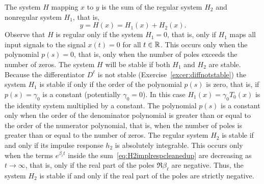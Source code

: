 
The system $H$ mapping $x$ to $y$ is the sum of the regular system $H_2$ and nonregular system $H_1$, that is,
\[
y = H(x) = H_1(x) + H_2(x).
\] 
Observe that $H$ is regular only if the system $H_1 = 0$, that is, only if $H_1$ maps all input signals to the signal $x(t) = 0$ for all $t \in {\mathbb R}$.  This occurs only when the polynomial $p(s) = 0$, that is, only when the number of poles exceeds the number of zeros.  The system $H$ will be stable if both $H_1$ and $H_2$ are stable.  Because the differentiator $D^\ell$ is not stable (Exercise~\ref{excer:diffnotstable}) the system $H_1$ is stable if only if the order of the polynomial $p(s)$ is zero, that is, if $p(s) = \gamma_0$ is a constant (potentially $\gamma_0 = 0$).  In this case $H_1(x) = \gamma_0 T_0(x)$ is the identity system multiplied by a constant.  The polynomial $p(s)$ is a constant only when the order of the denominator polynomial is greater than or equal to the order of the numerator polynomial, that is, when the number of poles is greater than or equal to the number of zeros.  The regular system $H_2$ is stable if and only if its impulse response $h_2$ is absolutely integrable.  This occurs only when the terms $e^{\beta_\ell t}$ inside the sum~\eqref{eq:H2implrespcleanedup} are decreasing as $t \rightarrow \infty$, that is, only if the real part of the poles $\Re{\beta_\ell}$ are negative.  Thus, the system $H_2$ is stable if and only if the real part of the poles are strictly negative.

